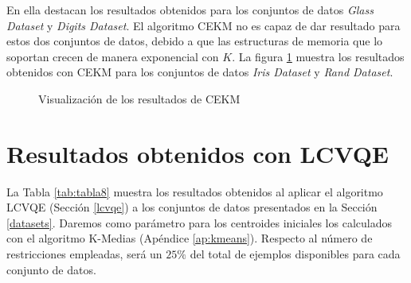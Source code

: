 En ella destacan los resultados obtenidos para los conjuntos de datos \textit{Glass Dataset} y \textit{Digits Dataset}. El algoritmo \acs{CEKM} no es capaz de dar resultado para estos dos conjuntos de datos, debido a que las estructuras de memoria que lo soportan crecen de manera exponencial con $K$. La figura \ref{fig:figure25} muestra los resultados obtenidos con \acs{CEKM} para los conjuntos de datos \textit{Iris Dataset} y \textit{Rand Dataset}.

\begin{figure}[bth]
	\myfloatalign
	\caption{Visualización de los resultados de \acs{CEKM}}\label{fig:figure25}
\end{figure}

\clearpage

\section{Resultados obtenidos con LCVQE}

La Tabla \ref{tab:tabla8} muestra los resultados obtenidos al aplicar el algoritmo \acf{LCVQE} (Sección \ref{lcvqe}) a los conjuntos de datos presentados en la Sección \ref{datasets}. Daremos como parámetro para los centroides iniciales los calculados con el algoritmo K-Medias (Apéndice \ref{ap:kmeans}). Respecto al número de restricciones empleadas, será un $25\%$ del total de ejemplos disponibles para cada conjunto de datos.

